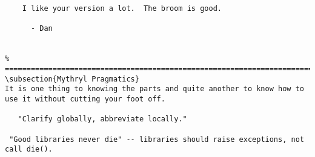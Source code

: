 \begin{verbatim}
    I like your version a lot.  The broom is good. 
 
      - Dan 
 

% ================================================================================
\subsection{Mythryl Pragmatics}
It is one thing to knowing the parts and quite another to know how to
use it without cutting your foot off.

   "Clarify globally, abbreviate locally."

 "Good libraries never die" -- libraries should raise exceptions, not call die().
 
 
\end{verbatim}